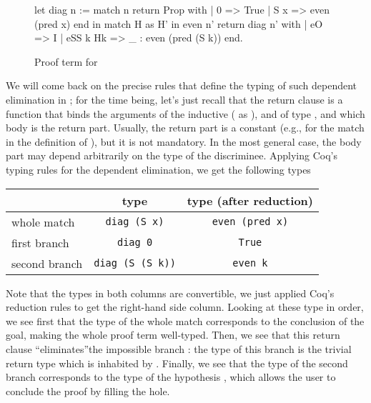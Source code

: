 \documentclass{llncs}
\begin{document}
\begin{figure}
  \centering

\begin{multicols}{2}
\begin{coq}
let diag n := 
  match n return Prop with
  | 0 => True
  | S x =>  even (pred x)
  end in
match H as H' in even n' return diag n' 
with 
| eO => I  
| eSS k Hk => _ : even (pred (S k)) end. 
\end{coq}
\end{multicols}
\caption{Proof term for }
  \label{fig:proof-term}
\end{figure}

We will come back on the precise rules that define the typing of such
dependent elimination in ; for the
time being, let's just recall that the return clause %
 is a function that binds the arguments of
the inductive ( as ), and  of type
, and which body is the return part. Usually, the return
part is a constant (e.g.,  for the match in the definition
of ), but it is not mandatory. In the most general
case, the body part may depend arbitrarily on the type of the
discriminee.
%
Applying Coq's typing rules for the dependent elimination, we get the following types \begin{center}
  \begin{tabular}{l@{\quad}cc}
     & type & type (after reduction) \\
     \hline
    whole match 
    & \lstinline[language=Coq, basicstyle=\normalsize]|diag (S x)| 
    & \lstinline[language=Coq, basicstyle=\normalsize]|even (pred x)| \\
    
    first branch 
    & \lstinline[language=Coq, basicstyle=\normalsize]|diag 0|
    & \lstinline[language=Coq, basicstyle=\normalsize]|True| \\
    
    second branch 
    & \lstinline[language=Coq, basicstyle=\normalsize]|diag (S (S k))|  
    & \lstinline[language=Coq, basicstyle=\normalsize]|even k| \\
\end{tabular}
\end{center}
%
Note that the types in both columns are convertible, we just applied Coq's reduction rules to get the right-hand side column.
%
Looking at these type in order, we see first that the type of the whole match corresponds to the conclusion of the goal, making the whole proof term well-typed.
%
Then, we see that this return clause ``eliminates''the impossible branch : the type of this branch is the trivial return type  which is inhabited by .
%
Finally, we see that the type of the second branch corresponds to the type of the hypothesis , which allows the user to conclude the proof by filling the hole. 
\end{document}
